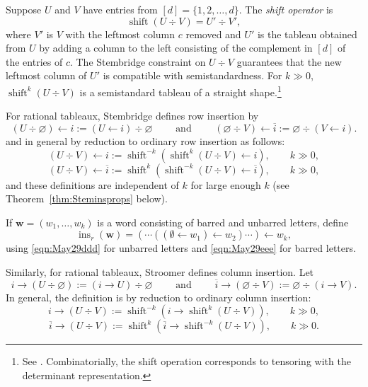 \documentclass[12pt]{amsart}
\newcommand{\bs}{\boldsymbol}
\DeclareMathOperator{\ins}{\operatorname{ins}}
\theoremstyle{definition}
\theoremstyle{remark}
\newcommand{\barindex}[1]{\overline{#1}}
\begin{document}
Suppose $U$ and $V$ have entries from $[d]=\{1,2,\ldots,d\}$.
The \emph{shift operator} is
\[\operatorname{shift}(U \div V) = U' \div V',\] 
where $V'$ is $V$ with the leftmost column $c$ removed and $U'$ is the 
tableau obtained from $U$ by adding a column to the left consisting of the complement in $[d]$ of the entries of $c$.
The Stembridge constraint on $U\div V$ guarantees that the new leftmost column of $U'$ is compatible with semistandardness. 
For $k\gg 0$, $\operatorname{shift}^k(U \div V)$ is a semistandard tableau of a straight shape.\footnote{See \cite[Proof of Proposition~2.4]{Stembridge}. Combinatorially, the shift operation corresponds to 
tensoring with the determinant representation.}

For rational tableaux, Stembridge \cite{Stembridge} defines row insertion by
\[
(U\div \varnothing)\leftarrow i := (U\leftarrow i)\div \varnothing
\qquad\text{ and }\qquad
(\varnothing\div V)\leftarrow\barindex{i} := \varnothing\div (V\leftarrow i).
\]
and in general by reduction to ordinary row insertion as follows:
\begin{equation}\label{eqn:May29ddd}
(U\div V) \leftarrow i:= \operatorname{shift}^{-k}(\operatorname{shift}^k(U\div V)\leftarrow i), \qquad k\gg 0,
\end{equation}
\begin{equation}\label{eqn:May29eee}
(U\div V) \leftarrow \barindex{i}:= \operatorname{shift}^k(\operatorname{shift}^{-k}(U\div V)\leftarrow \barindex{i}), \qquad k\gg 0,
\end{equation}
and these definitions are independent of $k$ for large enough $k$ (see Theorem~\ref{thm:Steminsprops} below). 

If ${\bs w}=(w_1,\ldots,w_k)$ is a word consisting of barred and unbarred letters, define
\[
\ins_r({\bs w})
=
(\cdots((\emptyset\leftarrow w_1)\leftarrow w_2)\cdots)\leftarrow w_k,
\]
 using
 \eqref{eqn:May29ddd} for unbarred letters and \eqref{eqn:May29eee} for barred letters. 
 
Similarly, for rational tableaux, Stroomer \cite{Stroomer} defines column insertion. Let
\[
i\rightarrow(U\div \varnothing) := (i\rightarrow U)\div \varnothing
\qquad\text{ and }\qquad
\barindex{i}\rightarrow(\varnothing\div V) := \varnothing\div (i\rightarrow V).
\]
In general, the definition is by reduction to ordinary column insertion:
\begin{equation}\label{eqn:May26aaa}
i\rightarrow(U\div V) := \operatorname{shift}^{-k}(i\rightarrow \operatorname{shift}^k(U\div V)), \qquad k\gg 0,
\end{equation}
\begin{equation}\label{eqn:May26bbb}
\barindex{i}\rightarrow(U\div V) := \operatorname{shift}^k(\barindex{i}\rightarrow \operatorname{shift}^{-k}(U\div V)), \qquad k\gg 0.
\end{equation}
\end{document}
